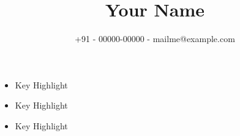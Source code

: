 \documentclass[10pt,letterpaper]{article}
\title{\textbf{\Large Your Name}}
\author{+91 - 00000-00000	-	mailme@example.com}
\date{}
\begin{document}
\maketitle












\begin{multicols}{3}
    \begin{itemize} \itemsep -2pt
    \item Key Highlight
    \item Key Highlight
    \item Key Highlight
    \end{itemize}
\end{multicols}
\end{document}
